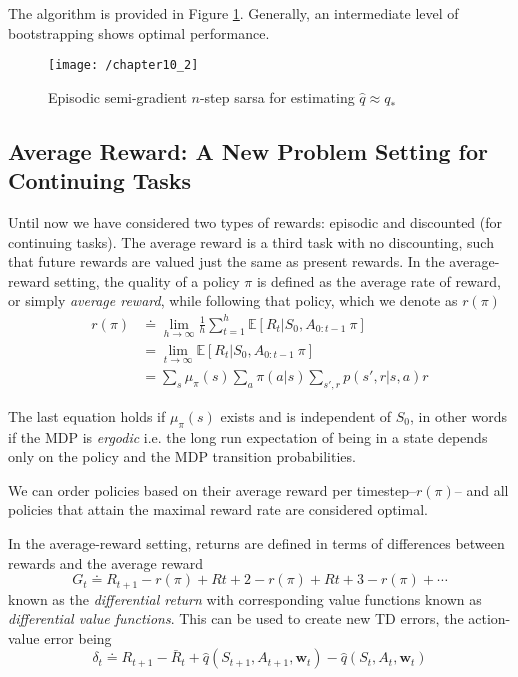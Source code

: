 The algorithm is provided in Figure \ref{fig: 10_2}. Generally, an intermediate level of bootstrapping shows optimal performance.

\begin{figure}[h!]
	\centering
	\texttt{[image: /chapter10\_2]}
	\caption{Episodic semi-gradient $n$-step sarsa for estimating $\hat{q} \approx q_*$}
	\label{fig: 10_2}
\end{figure}

\subsection{Average Reward: A New Problem Setting for Continuing Tasks}
Until now we have considered two types of rewards: episodic and discounted (for continuing tasks). The average reward is a third task with no discounting, such that future rewards are valued just the same as present rewards. In the average-reward setting, the quality of a policy $\pi$ is defined as the average rate of reward, or simply \textit{average reward}, while following that policy, which we denote as $r(\pi)$
\begin{align}
r(\pi) &\doteq \lim_{h \rightarrow \infty}\frac{1}{h} \sum_{t=1}^{h} \mathbb{E} \left[R_t | S_0, A_{0:t-1} ~ \pi \right] \\
&= \lim_{t \rightarrow \infty} \mathbb{E} \left[R_t | S_0, A_{0:t-1} ~ \pi \right] \\
&= \sum_{s} \mu_\pi(s) \sum_{a} \pi(a|s) \sum_{s', r} p(s', r|s,a)r
\end{align}

The last equation holds if $\mu_\pi(s)$ exists and is independent of $S_0$, in other words if the MDP is \textit{ergodic} i.e. the long run expectation of being in a state depends only on the policy and the MDP transition probabilities.

We can order policies based on their average reward per timestep–$r(\pi)$– and all policies that attain the maximal reward rate are considered optimal.

In the average-reward setting, returns are defined in terms of differences between rewards and the average reward
\begin{equation}
G_t \doteq R_{t+1} - r(\pi) + R{t+2} - r(\pi) + R{t+3} - r(\pi) + \cdots
\end{equation}
known as the \textit{differential return} with corresponding value functions known as \textit{differential value functions}. This can be used to create new TD errors, the action-value error being
\begin{equation}
\delta_t \doteq R_{t+1} - \bar{R}_t + \hat{q}(S_{t+1}, A_{t+1}, \textbf{w}_t) - \hat{q}(S_t, A_t, \textbf{w}_t)
\end{equation}

